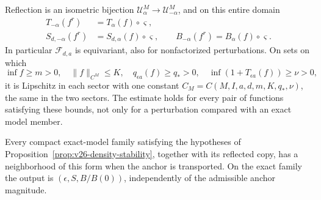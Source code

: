 \begin{proposition}
\label{prop:v29-transported-anchor}
Reflection is an isometric bijection
\(\mathcal U^M_\alpha\to\mathcal U^M_{-\alpha}\), and on this entire domain
\begin{equation}\label{eq:v29-exact-off-model-equivariance}
 \begin{split}
 T_{-\alpha}(f^r)&=T_\alpha(f)\circ\varsigma,\\
 S_{d,-\alpha}(f^r)&=S_{d,\alpha}(f)\circ\varsigma,\qquad
 B_{-\alpha}(f^r)=B_\alpha(f)\circ\varsigma.
 \end{split}
\end{equation}
In particular \(\mathcal F_{d,a}\) is equivariant, also for nonfactorized
perturbations.  On sets on which
\begin{equation}\label{eq:v29-uniform-domain}
 \inf f\ge m>0,\quad \|f\|_{C^M}\le K,\quad q_{\epsilon a}(f)\ge q_*>0,
 \quad \inf(1+T_{\epsilon a}(f))\ge\nu>0,
\end{equation}
it is Lipschitz in each sector with one constant
\(C_M=C(M,I,a,d,m,K,q_*,\nu)\), the same in the two sectors.  The estimate
holds for every pair of functions satisfying these bounds, not only for a
perturbation compared with an exact model member.

Every compact exact-model family satisfying the hypotheses of
Proposition~\ref{prop:v26-density-stability}, together with its reflected
copy, has a neighborhood of this form when the anchor is transported.
On the exact family the output is \((\epsilon,S,B/B(0))\), independently
of the admissible anchor magnitude.
\end{proposition}

